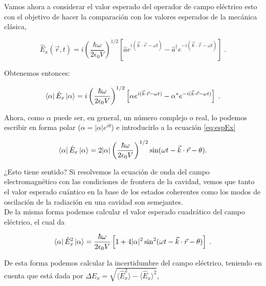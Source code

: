     Vamos ahora a considerar el valor esperado del operador de campo eléctrico esto con el objetivo de hacer la comparación con los valores esperados de la mecánica clásica,

    \begin{equation}
        \hat{E}_x(\Vec{r},t) = i\left(\frac{\hbar \omega}{2\epsilon_0V}\right)^{1/2}\left[\hat{a}e^{i(\Vec{k}\cdot \Vec{r} - \omega t)} - \hat{a}^{\dagger}e^{-i(\Vec{k}\cdot\Vec{r} - \omega t)} \right]\;.
    \end{equation}

    Obtenemos entonces:

    \begin{equation}\label{eq:espEx}
        \bra{\alpha} \hat{E}_x \ket{\alpha} = i\left(\frac{\hbar \omega}{2\epsilon_0V}\right)^{1/2}\left[\alpha e^{i(\Vec{k}\cdot \Vec{r} - \omega t)} - \alpha^{*}e^{-i(\Vec{k}\cdot\Vec{r} - \omega t)} \right]\;.
    \end{equation}

    Ahora, como $\alpha$ puede ser, en general, un número complejo o real, lo podemos escribir en forma polar ($\alpha = |\alpha|e^{i\theta}$) e introducirlo a la ecuación \ref{eq:espEx}

    \begin{equation}
        \bra{\alpha} \hat{E}_x \ket{\alpha} = 2|\alpha|\left(\frac{\hbar \omega}{2\epsilon_0V}\right)^{1/2}\sin(\omega t - \Vec{k}\cdot \Vec{r} - \theta).
    \end{equation}

    ¿Esto tiene sentido? Si resolvemos la ecuación de onda del campo electromagnético con las condiciones de frontera de la cavidad, vemos que tanto el valor esperado cuántico en la base de los estados coherentes como los modos de oscilación de la radiación en una cavidad son semejantes.\\

    De la misma forma podemos calcular el valor esperado cuadrático del campo eléctrico, el cual da

    \begin{equation}
        \bra{\alpha}\hat{E}_x^2\ket{\alpha} = \frac{\hbar\omega}{2\epsilon_0 V}\left[1 + 4|\alpha|^2\sin^2(\omega t - \Vec{k}\cdot \Vec{r} - \theta) \right]\;.
    \end{equation}

    De esta forma podemos calcular la incertidumbre del campo eléctrico, teniendo en cuenta que está dada por $\Delta E_x = \sqrt{\langle \hat{E}_x^{2}\rangle - \langle \hat{E}_x\rangle^{2}}$, 

